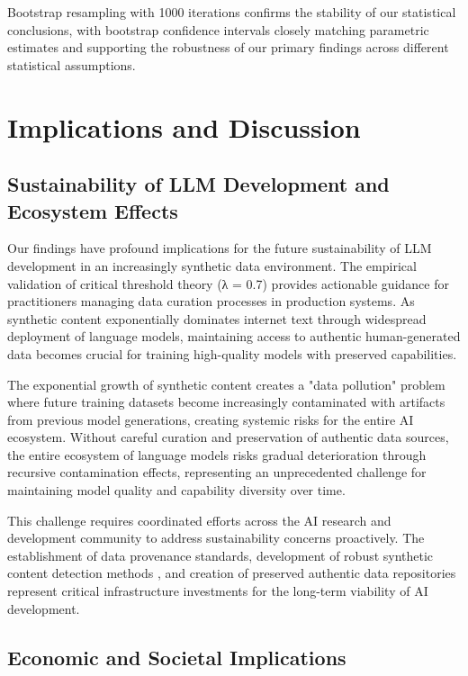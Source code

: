 \documentclass{article}
\begin{document}
Bootstrap resampling with 1000 iterations confirms the stability of our statistical conclusions, with bootstrap confidence intervals closely matching parametric estimates and supporting the robustness of our primary findings across different statistical assumptions.

\section{Implications and Discussion}

\subsection{Sustainability of LLM Development and Ecosystem Effects}

Our findings have profound implications for the future sustainability of LLM development in an increasingly synthetic data environment. The empirical validation of critical threshold theory (λ = 0.7) provides actionable guidance for practitioners managing data curation processes in production systems. As synthetic content exponentially dominates internet text through widespread deployment of language models, maintaining access to authentic human-generated data becomes crucial for training high-quality models with preserved capabilities.

The exponential growth of synthetic content creates a "data pollution" problem where future training datasets become increasingly contaminated with artifacts from previous model generations, creating systemic risks for the entire AI ecosystem. Without careful curation and preservation of authentic data sources, the entire ecosystem of language models risks gradual deterioration through recursive contamination effects, representing an unprecedented challenge for maintaining model quality and capability diversity over time.

This challenge requires coordinated efforts across the AI research and development community to address sustainability concerns proactively. The establishment of data provenance standards, development of robust synthetic content detection methods \cite{mitchell2023detectgpt, kirchenbauer2023watermark}, and creation of preserved authentic data repositories represent critical infrastructure investments for the long-term viability of AI development.

\subsection{Economic and Societal Implications}
\end{document}
